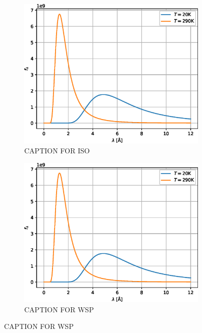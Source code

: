 \documentclass{article}
\begin{document}
\begin{figure}[htbp]
	\centering
	\begin{subfigure}[b]{0.3\textwidth}
		\centering
		\includegraphics[width=\textwidth]{source-spectrum}
		\caption{CAPTION FOR ISO}
		\label{fig:precession-devices:iso}
	\end{subfigure}
	\hfill
	\begin{subfigure}[b]{0.3\textwidth}
		\centering
		\includegraphics[width=\textwidth]{source-spectrum}
		\caption{CAPTION FOR WSP}
		\label{fig:precession-devices:wsp}
	\end{subfigure}
	\hfill

\end{figure}
\end{document}
